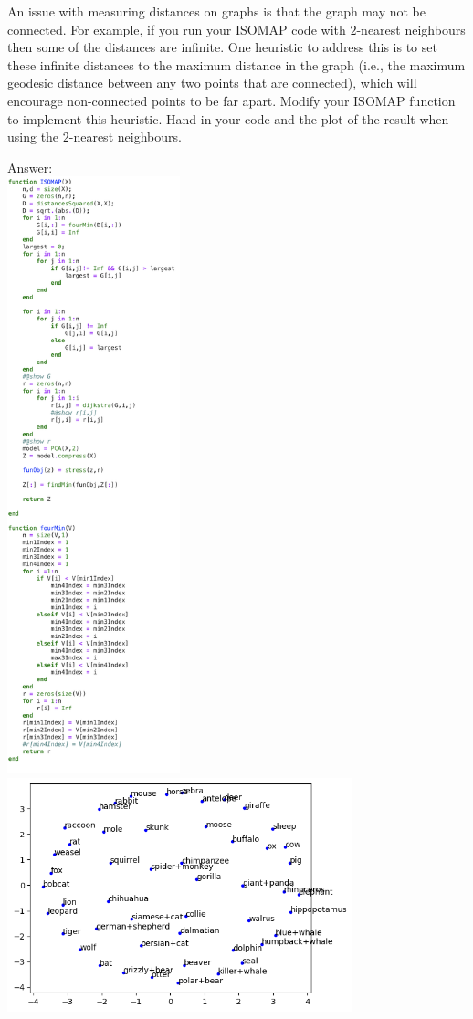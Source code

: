 \documentclass{article}
\def\ans#1{\par\gre{Answer: #1}}
\def\blu#1{{\color{blu}#1}}
\def\gre#1{{\color{gre}#1}}
\begin{document}
An issue with measuring distances on graphs is that the graph may not be connected. For example, if you run your ISOMAP code with $2$-nearest neighbours then some of the distances are infinite. One heuristic to address this is to set these infinite distances to the maximum distance in the graph (i.e., the maximum geodesic distance between any two points that are connected), which will encourage non-connected points to be far apart. Modify your ISOMAP function to implement this heuristic. \blu{Hand in your code and the plot of the result when using the $2$-nearest neighbours}.
\ans{
    \\
    \includegraphics[width = 5cm]{Q22Code.png}
    \includegraphics[width = 10cm]{Q22Graph.png}}
\end{document}

